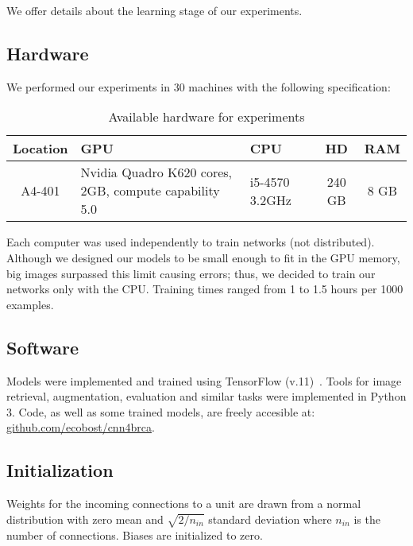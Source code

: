 We offer details about the learning stage of our experiments.

\subsection{Hardware}
We performed our experiments in 30 machines with the following specification:
\begin{table}[h]
	\centering
	\begin{tabular}{cp{3.8cm}p{1.8cm}cc}
	\hline
	\textbf{Location}	& \textbf{GPU}	& \textbf{CPU} &\textbf{HD}	& \textbf{RAM}\\
	\hline
	A4-401 & Nvidia Quadro K620 \newline 384 cores, 2GB, compute capability 5.0 & i5-4570 \newline 3.2GHz	& 240 GB & 8 GB\\
	\hline
	\end{tabular}
	\caption{Available hardware for experiments}
\end{table}

Each computer was used independently to train networks (not distributed). Although we designed our models to be small enough to fit in the GPU memory, big images surpassed this limit causing errors; thus, we decided to train our networks only with the CPU. Training times ranged from 1 to 1.5 hours per 1000 examples.

\subsection{Software}
Models were implemented and trained using TensorFlow (v.11)~\cite{Abadi2015}. Tools for image retrieval, augmentation, evaluation and similar tasks were implemented in Python 3.
Code, as well as some trained models, are freely accesible at: \url{github.com/ecobost/cnn4brca}.

\subsection{Initialization}
Weights for the incoming connections to a unit are drawn from a normal distribution with zero mean and $\sqrt{2/n_{in}}$ standard deviation where $n_{in}$ is the number of connections. Biases are initialized to zero.

